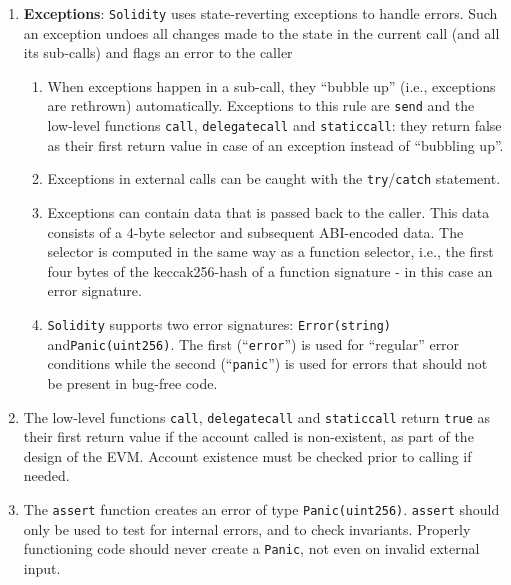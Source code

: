 \begin{enumerate}
\item\textbf{Exceptions}: \verb|Solidity| uses state-reverting exceptions to handle errors. Such an exception undoes all changes made to the state in the current call (and all its sub-calls) and flags an error to the caller
    \begin{enumerate}
    \item When exceptions happen in a sub-call, they “bubble up” (i.e., exceptions are rethrown) automatically. Exceptions to this rule are \verb|send| and the low-level functions \verb|call|, \verb|delegatecall| and \verb|staticcall|: they return false as their first return value in case of an exception instead of “bubbling up”.
    \item Exceptions in external calls can be caught with the \verb|try|/\verb|catch| statement.
    \item Exceptions can contain data that is passed back to the caller. This data consists of a 4-byte selector and subsequent ABI-encoded data. The selector is computed in the same way as a function selector, i.e., the first four bytes of the keccak256-hash of a function signature - in this case an error signature.
    \item\verb|Solidity| supports two error signatures: \verb|Error(string)| and\linebreak\verb|Panic(uint256)|. The first (“\verb|error|”) is used for “regular” error conditions while the second (“\verb|panic|”) is used for errors that should not be present in bug-free code.
    \end{enumerate}

\item The low-level functions \verb|call|, \verb|delegatecall| and \verb|staticcall| return \verb|true| as their first return value if the account called is non-existent, as part of the design of the EVM. Account existence must be checked prior to calling if needed.

\item The \verb|assert| function creates an error of type \verb|Panic(uint256)|. \verb|assert| should only be used to test for internal errors, and to check invariants. Properly functioning code should never create a \verb|Panic|, not even on invalid external input.


\end{enumerate}

